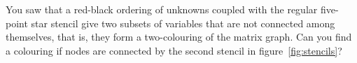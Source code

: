   You saw that a red-black ordering of unknowns
  coupled with the regular five-point star stencil give two subsets of
  variables that are not connected among themselves, that is,
  they form a two-colouring of the matrix graph.
  Can you find a colouring if nodes are connected by the second stencil in
  figure~\ref{fig:stencils}?
